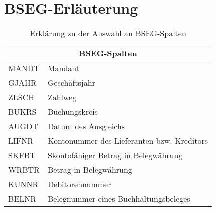 \section{BSEG-Erläuterung}

\begin{table}[h]
	\centering
	\begin{tabular}{ |l|l| }
		\hline
		\multicolumn{2}{|c|}{BSEG-Spalten} \\
		\hline
		MANDT & Mandant \\
		GJAHR & Geschäftsjahr \\
		ZLSCH & Zahlweg \\
		BUKRS & Buchungskreis \\
		AUGDT & Datum des Ausgleichs \\
		LIFNR & Kontonummer des Lieferanten bzw. Kreditors \\
		SKFBT & Skontofähiger Betrag in Belegwährung \\
		WRBTR & Betrag in Belegwährung \\
		KUNNR & Debitorennummer \\
		BELNR & Belegnummer eines Buchhaltungsbeleges \\
		\hline
	\end{tabular}
	\caption{Erklärung zu der Auswahl an BSEG-Spalten}
	\label{tab:bsegerlaeuterung}
\end{table}